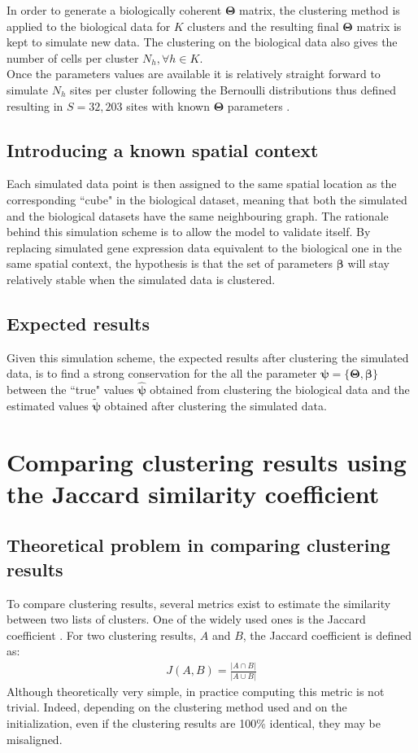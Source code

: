 	In order to generate a biologically coherent $\boldsymbol{\Theta}$ matrix, the clustering method is applied to the biological data for $K$ clusters and the resulting final $\boldsymbol{\Theta}$ matrix is kept to simulate new data. The clustering on the biological data also gives the number of cells per cluster $N_h, \forall h \in K$.\\
	
	Once the parameters values are available it is relatively straight forward to simulate $N_h$ sites per cluster following the Bernoulli distributions thus defined resulting in $S=32,203$ sites with known $\boldsymbol{\Theta}$ parameters .
	\subsection{Introducing a known spatial context}\label{subsec:simul_spatial}
	Each simulated data point is then assigned to the same spatial location as the corresponding ``cube" in the biological dataset, meaning that both the simulated and the biological datasets have the same neighbouring graph. The rationale behind this simulation scheme is to allow the model to validate itself. By replacing simulated gene expression data equivalent to the biological one in the same spatial context, the hypothesis is that the set of parameters $\boldsymbol{\beta}$ will stay relatively stable when the simulated data is clustered.
	\subsection{Expected results}\label{subsec:expected_simul_results}
	Given this simulation scheme, the expected results after clustering the simulated data, is to find a strong conservation for the all the parameter $\boldsymbol{\psi} = \{\boldsymbol{\Theta},\boldsymbol{\beta}\}$ between the ``true" values $\hat{\boldsymbol{\psi}}$ obtained from clustering the biological data and the estimated values $\widetilde{\boldsymbol{\psi}}$ obtained after clustering the simulated data.\\

\section{Comparing clustering results using the Jaccard similarity coefficient}
	\subsection{Theoretical problem in comparing clustering results}
To compare clustering results, several metrics exist to estimate the similarity between two lists of clusters. One of the widely used ones is the Jaccard coefficient \cite{jaccard1901}. For two clustering results, $A$ and $B$, the Jaccard coefficient is defined as: 
\begin{align*}
J(A,B) = \frac{|A \cap B|}{|A \cup B|}
\end{align*}
Although theoretically very simple, in practice computing this metric is not trivial. Indeed, depending on the clustering method used and on the initialization, even if the clustering results are 100\% identical, they may be misaligned.\\

